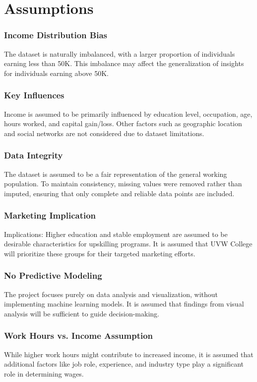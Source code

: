 \documentclass[journal,onecolumn]{IEEEtran}
\begin{document}
\section{Assumptions}
\subsubsection{Income Distribution Bias}The dataset is naturally imbalanced, 
with a larger proportion of individuals earning less than 50K. This imbalance may 
affect the generalization of insights for individuals earning above 50K.
\subsubsection{Key Influences}
Income is assumed to be primarily influenced by education level, occupation,
 age, hours worked, and capital gain/loss. Other factors such as geographic
  location and social networks are not considered due to dataset limitations.
\subsubsection{Data Integrity}
The dataset is assumed to be a fair representation of the general working 
population. To maintain consistency, missing values were removed rather 
than imputed, ensuring that only complete and reliable data points are 
included.
\subsubsection{Marketing Implication}
Implications: Higher education and stable employment are assumed to be 
desirable characteristics for upskilling programs. It is assumed that UVW 
College will prioritize these groups for their targeted marketing efforts.
\subsubsection{No Predictive Modeling}
The project focuses purely on data analysis and visualization, without 
implementing machine learning models. It is assumed that findings from 
visual analysis will be sufficient to guide decision-making.
\subsubsection{Work Hours vs. Income Assumption}
While higher work hours might contribute to increased income, it is assumed
 that additional factors like job role, experience, and industry type play
  a significant role in determining wages.
\end{document}
